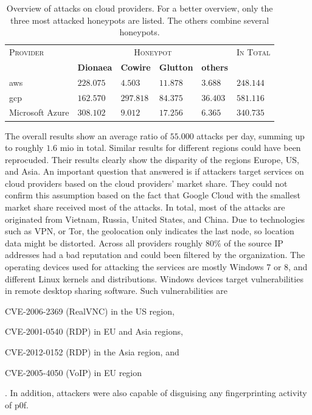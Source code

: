\begin{table}
    \centering
    \caption[Overview of attacks on cloud providers]{Overview of attacks on cloud providers. For a better overview, only the three most attacked honeypots are listed. The others combine several honeypots.}
    \begin{tabularx}{\linewidth}{l|XXXX|l}
        \toprule
        \textsc{Provider} & \multicolumn{4}{c|}{\textsc{Honeypot}} & \textsc{In Total}                                                  \\
                          & \textbf{Dionaea}                       & \textbf{Cowire}   & \textbf{Glutton} & \textbf{others} &           \\
        \hline
        \acl{aws}         & $228.075$                              & $4.503$           & $11.878$         & $3.688$         & $248.144$ \\
        \acl{gcp}         & $162.570$                              & $297.818$         & $84.375$         & $36.403$        & $581.116$ \\
        Microsoft Azure   & $308.102$                              & $9.012$           & $17.256$         & $6.365$         & $340.735$ \\
        \bottomrule
    \end{tabularx}
    \label{tab:overview-cloud-security}
\end{table}

The overall results show an average ratio of $55.000$ attacks per day, summing up to roughly $1.6$ mio in total.
Similar results for different regions could have been reprocuded.
Their results clearly show the disparity of the regions Europe, US, and Asia.
An important question that \citet{Kelly2021} answered is if attackers target services on cloud providers based on the cloud providers' market share.
They could not confirm this assumption based on the fact that Google Cloud with the smallest market share received most of the attacks.
In total, most of the attacks are originated from Vietnam, Russia, United States, and China.
Due to technologies such as VPN, or Tor, the geolocation only indicates the last node, so location data might be distorted.
Across all providers roughly $80\%$ of the source IP addresses had a bad reputation and could been filtered by the organization.
The operating devices used for attacking the services are mostly Windows 7 or 8, and different Linux kernels and distributions.
Windows devices target vulnerabilities in remote desktop sharing software. Such vulnerabilities are
\begin{enumerate*}[label=(\roman*)]
    \item CVE-2006-2369\cite{CVE-2006-2369} (RealVNC) in the US region,
    \item CVE-2001-0540\cite{CVE-2001-0540} (RDP) in EU and Asia regions,
    \item CVE-2012-0152\cite{CVE-2012-0152} (RDP) in the Asia region, and
    \item CVE-2005-4050\cite{CVE-2005-4050} (VoIP) in EU region
\end{enumerate*}.
In addition, attackers were also capable of disguising any fingerprinting activity of p0f.

